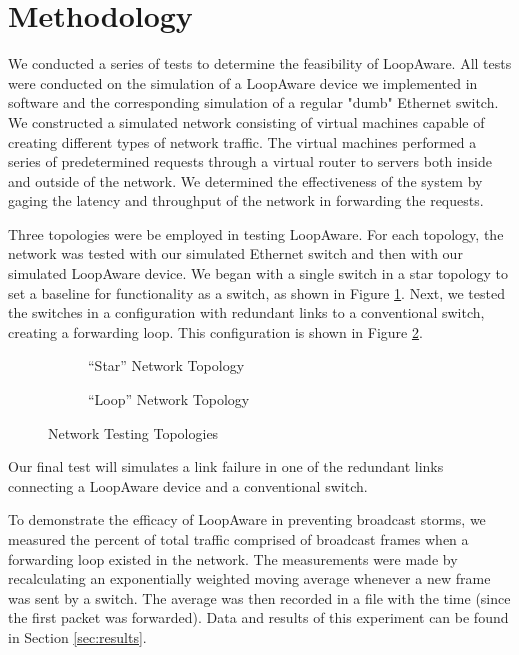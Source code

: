 \section{Methodology}
\label{sec:methodology}
    We conducted a series of tests to determine the feasibility of LoopAware.
    All tests were conducted on the simulation of a LoopAware device we implemented in software and the corresponding simulation of a regular "dumb" Ethernet switch.
    We constructed a simulated network consisting of virtual machines capable of creating different types of network traffic.
    The virtual machines performed a series of predetermined requests through a virtual router to servers both inside and outside of the network.
    We determined the effectiveness of the system by gaging the latency and throughput of the network in forwarding the requests.

    Three topologies were be employed in testing LoopAware.
    For each topology, the network was tested with our simulated Ethernet switch and then with our simulated LoopAware device.
    We began with a single switch in a star topology to set a baseline for functionality as a switch, as shown in Figure \ref{fig:startop}.
    Next, we tested the switches in a configuration with redundant links to a conventional switch, creating a forwarding loop.
    This configuration is shown in Figure \ref{fig:looptop}.
    \begin{figure}[ht]
        \centering
        \begin{subfigure}[b]{0.4\textwidth}
            \centering
            
            \label{fig:startop}
            \caption{``Star'' Network Topology}
        \end{subfigure}
        \hfill
        \begin{subfigure}[b]{0.4\textwidth}
            \centering
            
            \label{fig:looptop}
            \caption{``Loop'' Network Topology}
        \end{subfigure}
        \label{fig:topologies}
        \caption{Network Testing Topologies}
    \end{figure}
    Our final test will simulates a link failure in one of the redundant links connecting a LoopAware device and a conventional switch.

    To demonstrate the efficacy of LoopAware in preventing broadcast storms, we measured the percent of total traffic comprised of broadcast frames when a forwarding loop existed in the network.
    The measurements were made by recalculating an exponentially weighted moving average whenever a new frame was sent by a switch.
    The average was then recorded in a file with the time (since the first packet was forwarded).
    Data and results of this experiment can be found in Section \ref{sec:results}.


